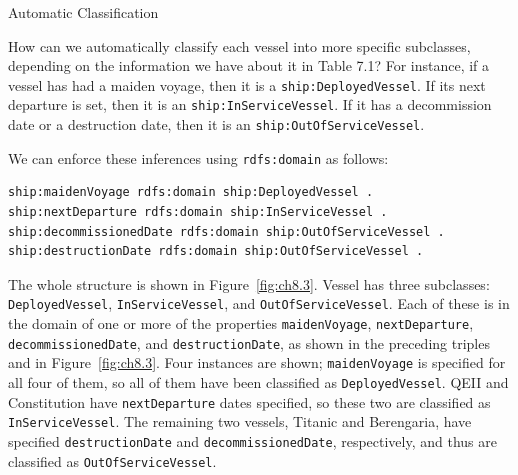 \begin{challenge}{Automatic Classification}
\label{chal:10}

How can we automatically classify each vessel into more specific
subclasses, depending on the information we have about it in Table 7.1?
For instance, if a vessel has had a maiden voyage, then it is a
\texttt{ship:DeployedVessel}. If its next departure is set, then it is an
\texttt{ship:InServiceVessel}. If it has a decommission date or a destruction
date, then it is an \texttt{ship:OutOfServiceVessel}.

\solution

We can enforce these inferences using \texttt{rdfs:domain} as follows:

\begin{lstlisting}
ship:maidenVoyage rdfs:domain ship:DeployedVessel .
ship:nextDeparture rdfs:domain ship:InServiceVessel .
ship:decommissionedDate rdfs:domain ship:OutOfServiceVessel .
ship:destructionDate rdfs:domain ship:OutOfServiceVessel .
\end{lstlisting}

The whole structure is shown in Figure~\ref{fig:ch8.3}. Vessel has three subclasses:
\texttt{DeployedVessel}, \texttt{InServiceVessel}, and \texttt{OutOfServiceVessel}. Each of these
is in the domain of one or more of the properties \texttt{maidenVoyage},
\texttt{nextDeparture}, \texttt{decommissionedDate}, and \texttt{destructionDate}, as shown in the
preceding triples and in Figure~\ref{fig:ch8.3}. Four instances are shown;
\texttt{maidenVoyage} is specified for all four of them, so all of them have been
classified as \texttt{DeployedVessel}. QEII and Constitution have \texttt{nextDeparture}
dates specified, so these two are classified as \texttt{InServiceVessel}. The
remaining two vessels, Titanic and Berengaria, have specified
\texttt{destructionDate} and \texttt{decommissionedDate}, respectively, and thus are
classified as \texttt{OutOfServiceVessel}.
\end{challenge}


